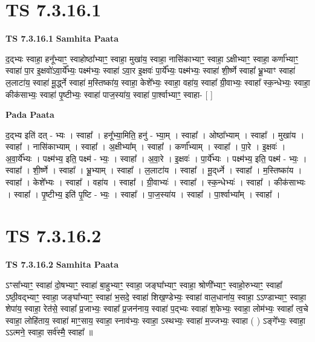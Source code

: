 \documentclass[17pt]{extarticle}
\begin{document}
\section*{ TS 7.3.16.1 }

\textbf{TS 7.3.16.1 } \newline
\textbf{Samhita Paata} \newline

द॒द्भ्यः स्वाहा॒ हनू᳚भ्याꣳ॒॒ स्वाहोष्ठा᳚भ्याꣳ॒॒ स्वाहा॒ मुखा॑य॒ स्वाहा॒ नासि॑काभ्याꣳ॒॒ स्वाहा॒ ऽक्षीभ्याꣳ॒॒ स्वाहा॒ कर्णा᳚भ्याꣳ॒॒ स्वाहा॑ पा॒र इ॒क्षवो॑ऽवा॒र्ये᳚भ्यः॒ पक्ष्म॑भ्यः॒ स्वाहा॑ ऽवा॒र इ॒क्षवः॑ पा॒र्ये᳚भ्यः॒ पक्ष्म॑भ्यः॒ स्वाहा॑ शी॒र्ष्णे स्वाहा᳚ भ्रू॒भ्याꣳ स्वाहा॑ ल॒लाटा॑य॒ स्वाहा॑ मू॒र्द्ध्ने स्वाहा॑ म॒स्तिष्का॑य॒ स्वाहा॒ केशे᳚भ्यः॒ स्वाहा॒ वहा॑य॒ स्वाहा᳚ ग्री॒वाभ्यः॒ स्वाहा᳚ स्क॒न्धेभ्यः॒ स्वाहा॒ कीक॑साभ्यः॒ स्वाहा॑ पृ॒ष्टीभ्यः॒ स्वाहा॑ पाज॒स्या॑य॒ स्वाहा॑ पा॒र्श्वाभ्याꣳ॒॒ स्वाहा- [  ] \newline

\textbf{Pada Paata} \newline

द॒द्भ्य इति॑ दत् - भ्यः । स्वाहा᳚ । हनू᳚भ्या॒मिति॒ हनु॑ - भ्या॒म् । स्वाहा᳚ । ओष्ठा᳚भ्याम् । स्वाहा᳚ । मुखा॑य । स्वाहा᳚ । नासि॑काभ्याम् । स्वाहा᳚ । अ॒क्षीभ्या᳚म् । स्वाहा᳚ । कर्णा᳚भ्याम् । स्वाहा᳚ । पा॒रे । इ॒क्षवः॑ । अ॒वा॒र्ये᳚भ्यः । पक्ष्म॑भ्य॒ इति॒ पक्ष्म॑ - भ्यः॒ । स्वाहा᳚ । अ॒वा॒रे । इ॒क्षवः॑ । पा॒र्ये᳚भ्यः । पक्ष्म॑भ्य॒ इति॒ पक्ष्म॑ - भ्यः॒ । स्वाहा᳚ । शी॒र्ष्णे । स्वाहा᳚ । भ्रू॒भ्याम् । स्वाहा᳚ । ल॒लाटा॑य । स्वाहा᳚ । मू॒द्‌र्ध्ने । स्वाहा᳚ । म॒स्तिष्का॑य । स्वाहा᳚ । केशे᳚भ्यः । स्वाहा᳚ । वहा॑य । स्वाहा᳚ । ग्री॒वाभ्यः॑ । स्वाहा᳚ । स्क॒न्धेभ्यः॑ । स्वाहा᳚ । कीक॑साभ्यः । स्वाहा᳚ । पृ॒ष्टीभ्य॒ इति॑ पृ॒ष्टि - भ्यः॒ । स्वाहा᳚ । पा॒ज॒स्या॑य । स्वाहा᳚ । पा॒र्श्वाभ्या᳚म् । स्वाहा᳚ ।  \newline




\section*{ TS 7.3.16.2 }

\textbf{TS 7.3.16.2 } \newline
\textbf{Samhita Paata} \newline

ऽꣳसा᳚भ्याꣳ॒॒ स्वाहा॑ दो॒षभ्याꣳ॒॒ स्वाहा॑ बा॒हुभ्याꣳ॒॒ स्वाहा॒ जङ्घा᳚भ्याꣳ॒॒ स्वाहा॒ श्रोणी᳚भ्याꣳ॒॒ स्वाहो॒रुभ्याꣳ॒॒ स्वाहा᳚ ऽष्ठी॒वद्भ्याꣳ॒॒ स्वाहा॒ जङ्घा᳚भ्याꣳ॒॒ स्वाहा॑ भ॒सदे॒ स्वाहा॑ शिख॒ण्डेभ्यः॒ स्वाहा॑ वाल॒धाना॑य॒ स्वाहा॒ ऽऽण्डाभ्याꣳ॒॒ स्वाहा॒ शेपा॑य॒ स्वाहा॒ रेत॑से॒ स्वाहा᳚ प्र॒जाभ्यः॒ स्वाहा᳚ प्र॒जन॑नाय॒ स्वाहा॑ प॒द्भ्यः स्वाहा॑ श॒फेभ्यः॒ स्वाहा॒ लोम॑भ्यः॒ स्वाहा᳚ त्व॒चे स्वाहा॒ लोहि॑ताय॒ स्वाहा॑ माꣳ॒॒साय॒ स्वाहा॒ स्नाव॑भ्यः॒ स्वाहा॒ ऽस्थभ्यः॒ स्वाहा॑ म॒ज्जभ्यः॒ स्वाहा ( ) ऽङ्गे᳚भ्यः॒ स्वाहा॒ ऽऽत्मने॒ स्वाहा॒ सर्व॑स्मै॒ स्वाहा᳚ ॥ \newline
\end{document}
